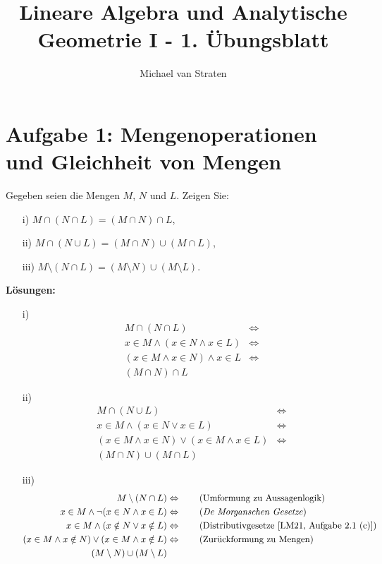 \documentclass{exam}
\title{Lineare Algebra und Analytische Geometrie I - 1. Übungsblatt}
\author{Michael van Straten}
\begin{document}
    \maketitle
    \section*{Aufgabe 1: Mengenoperationen und Gleichheit von Mengen}
    Gegeben seien die Mengen $M$, $N$ und $L$. Zeigen Sie:
    \begin{enumerate}
        \item[i)] $M \cap (N \cap L) = (M \cap N) \cap L$,
        \item[ii)] $M \cap (N \cup L) = (M \cap N) \cup (M \cap L)$,
        \item[iii)] $M \setminus (N \cap L) = (M \setminus N) \cup (M \setminus L)$.
    \end{enumerate} 
    \textbf{Lösungen:}
    \begin{enumerate}
        \item[i)]  
        \begin{align*}
            M \cap (N \cap L) &\Leftrightarrow \tag{Umformung zu Aussagenlogik} \\
            x \in M \land (x \in N \land x \in L) &\Leftrightarrow \tag{Assoziativgesetze [LM21, Aufgabe 2.1 (a)]} \\ 
            (x \in M \land x \in N) \land x \in L &\Leftrightarrow \tag{Zurückformung zu Mengen} \\
            (M \cap N) \cap L 
        \end{align*}
        \item[ii)]  
        \begin{align*}
            M \cap (N \cup L) &\Leftrightarrow \tag{Umformung zu Aussagenlogik} \\
            x \in M \land (x \in N \lor x \in L) &\Leftrightarrow \tag{Distributivgesetze [LM21, Aufgabe 2.1 (c)]} \\
            (x \in M \land x \in N) \lor (x \in M \land x \in L) &\Leftrightarrow \tag{Zurückformung zu Mengen} \\
            (M \cap N) \cup (M \cap L) 
        \end{align*}
        \item[iii)]  
        \begin{align*}
            M \setminus (N \cap L) &\Leftrightarrow \tag{Umformung zu Aussagenlogik} \\
            x \in M \land \neg (x \in N \land x \in L) &\Leftrightarrow \tag{\textit{De Morganschen Gesetze}} \\
            x \in M \land (x \notin N \lor x \notin L) &\Leftrightarrow \tag{Distributivgesetze [LM21, Aufgabe 2.1 (c)]} \\
            (x \in M \land x \notin N) \lor (x \in M \land x \notin L) &\Leftrightarrow \tag{Zurückformung zu Mengen} \\
            (M \setminus N) \cup (M \setminus L) 
        \end{align*}
    \end{enumerate}
\end{document}

